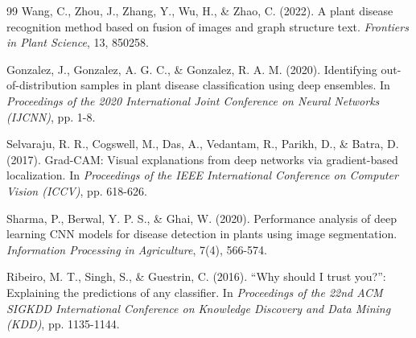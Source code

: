\begin{thebibliography}{99}
Wang, C., Zhou, J., Zhang, Y., Wu, H., \& Zhao, C. (2022). A plant disease recognition method based on fusion of images and graph structure text.
\textit{Frontiers in Plant Science}, 13, 850258.

Gonzalez, J., Gonzalez, A. G. C., \& Gonzalez, R. A. M. (2020). Identifying out-of-distribution samples in plant disease classification using deep ensembles.
In \textit{Proceedings of the 2020 International Joint Conference on Neural Networks (IJCNN)}, pp. 1-8.

Selvaraju, R. R., Cogswell, M., Das, A., Vedantam, R., Parikh, D., \& Batra, D. (2017). Grad-CAM: Visual explanations from deep networks via gradient-based localization.
In \textit{Proceedings of the IEEE International Conference on Computer Vision (ICCV)}, pp. 618-626.

Sharma, P., Berwal, Y. P. S., \& Ghai, W. (2020). Performance analysis of deep learning CNN models for disease detection in plants using image segmentation.
\textit{Information Processing in Agriculture}, 7(4), 566-574.

Ribeiro, M. T., Singh, S., \& Guestrin, C. (2016). ``Why should I trust you?'': Explaining the predictions of any classifier.
In \textit{Proceedings of the 22nd ACM SIGKDD International Conference on Knowledge Discovery and Data Mining (KDD)}, pp. 1135-1144.

\end{thebibliography}